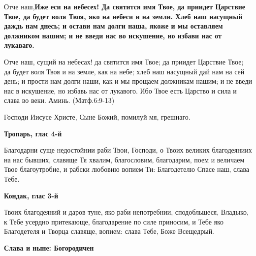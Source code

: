 


 

 

Отче наш,\bfseries  \normalfont{}Иже еси на небесех! Да святится имя Твое, да приидет Царствие Твое, да будет воля Твоя, яко на небеси и на земли. Хлеб наш насущный даждь нам днесь; и остави нам долги наша, якоже и мы оставляем должником нашим; и не введи нас во искушение, но избави нас от лукаваго.


Отче наш, сущий на небесах! да святится имя Твое; да приидет Царствие Твое; да будет воля Твоя и на земле, как на небе; хлеб наш насущный дай нам на сей день; и прости нам долги наши, как и мы прощаем должникам нашим; и не введи нас в искушение, но избавь нас от лукавого. Ибо Твое есть Царство и сила и слава во веки. Аминь. (Матф.6:9-13)

\mychapterending

 

Господи Иисусе Христе, Сыне Божий, помилуй мя, грешнаго. 


\mychapterending

 

\bfseries Тропарь, глас 4-й\normalfont{}


Благодарни суще недостойнии раби Твои, Господи, о Твоих великих благодеяниих на нас бывших, славяще Тя хвалим, благословим, благодарим, поем и величаем Твое благоутробие, и рабски любовию вопием Ти: Благодетелю Спасе наш, слава Тебе.




\medskip


\bfseries Кондак, глас 3-й\normalfont{}


Твоих благодеяний и даров туне, яко раби непотребнии, сподобльшеся, Владыко, к Тебе усердно притекающе, благодарение по силе приносим, и Тебе яко Благодетеля и Творца славяще, вопием: слава Тебе, Боже Всещедрый.


\medskip


\bfseries Слава и ныне: Богородичен\normalfont{}


